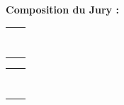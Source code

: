 \begin{titlepage}
\begin{singlespace}
\begin{textblock}{11}
	\begin{flushleft}
	\small \textbf{Composition du Jury :}
	\vfill
	\footnotesize
	\begin{tabular}{|p{10.5cm}l}
		\arrayrulecolor{bordeau}
		\textbf{\jurynameA} & \juryroleA  \\ \juryadressA \\[5pt]
		\textbf{\jurynameB} & \juryroleB  \\ \juryadressB \\[5pt]
		\textbf{\jurynameC} & \juryroleC  \\ \juryadressC \\[5pt]
		\textbf{\jurynameD} & \juryroleD  \\ \juryadressD \\[5pt]
	\end{tabular} 
	\vfill
	\begin{tabular}{p{10.5cm}l}
		\textbf{\jurynameE} & \juryroleE  \\ \juryadressE \\[5pt]
		\textbf{\jurynameF} & \juryroleF  \\ \juryadressF \\[5pt]
		\textbf{\jurynameG} & \juryroleG  \\ \juryadressG \\[5pt]
		\textbf{\jurynameH} & \juryroleH  \\ \juryadressH \\[5pt]
	\end{tabular} 
	\end{flushleft}   
\end{textblock}
\end{singlespace}
\end{titlepage}
\afterpage{\blankpagewithcount}

